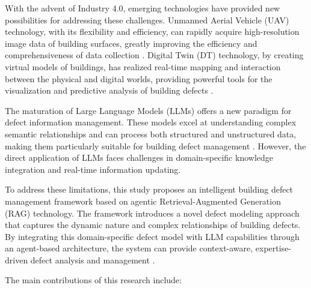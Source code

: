 \documentclass[a4paper,fleqn]{cas-sc}
\begin{document}
With the advent of Industry 4.0, emerging technologies have provided new possibilities for addressing these challenges. Unmanned Aerial Vehicle (UAV) technology, with its flexibility and efficiency, can rapidly acquire high-resolution image data of building surfaces, greatly improving the efficiency and comprehensiveness of data collection \cite{mohammadi2023integration}. Digital Twin (DT) technology, by creating virtual models of buildings, has realized real-time mapping and interaction between the physical and digital worlds, providing powerful tools for the visualization and predictive analysis of building defects \cite{chen2023improving}.

The maturation of Large Language Models (LLMs) offers a new paradigm for defect information management. These models excel at understanding complex semantic relationships and can process both structured and unstructured data, making them particularly suitable for building defect management \cite{gao2023survey}. However, the direct application of LLMs faces challenges in domain-specific knowledge integration and real-time information updating.

To address these limitations, this study proposes an intelligent building defect management framework based on agentic Retrieval-Augmented Generation (RAG) technology. The framework introduces a novel defect modeling approach that captures the dynamic nature and complex relationships of building defects. By integrating this domain-specific defect model with LLM capabilities through an agent-based architecture, the system can provide context-aware, expertise-driven defect analysis and management \cite{ding2024survey}.

The main contributions of this research include:
\end{document}
